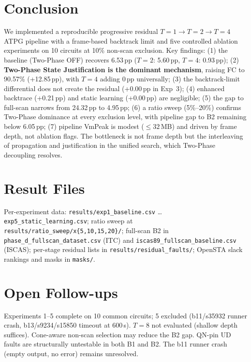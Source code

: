 \documentclass[conference]{IEEEtran}
\begin{document}
\section{Conclusion}
\label{sec:conclusion}
We implemented a reproducible progressive residual
$T{=}1{\to}T{=}2{\to}T{=}4$ ATPG pipeline with a frame-based backtrack limit and
five controlled ablation experiments on 10 circuits at 10\% non-scan exclusion.
Key findings: (1) the baseline (Two-Phase OFF) recovers 6.53\,pp ($T{=}2$:
5.60\,pp, $T{=}4$: 0.93\,pp); (2) \textbf{Two-Phase State Justification is the
dominant mechanism}, raising FC to 90.57\% (+12.85\,pp), with $T{=}4$ adding
0\,pp universally; (3) the backtrack-limit differential does not create the residual
(+0.00\,pp in Exp~3); (4) enhanced backtrace (+0.21\,pp) and static learning
(+0.00\,pp) are negligible; (5) the gap to full-scan narrows from 24.32\,pp to
4.95\,pp; (6) a ratio sweep (5\%--20\%) confirms Two-Phase dominance at every
exclusion level, with pipeline gap to B2 remaining below 6.05\,pp; (7) pipeline
VmPeak is modest (${\leq}32$\,MB) and driven by frame depth, not ablation flags.
The bottleneck is not frame depth but the interleaving of propagation and
justification in the unified search, which Two-Phase decoupling resolves.

\appendices
\section{Result Files}
Per-experiment data: \texttt{results/exp1\_baseline.csv} \ldots
\texttt{exp5\_static\_learning.csv}; ratio sweep at
\texttt{results/ratio\_sweep/x\{5,10,15,20\}/}; full-scan B2 in
\texttt{phase\_d\_fullscan\_dataset.csv} (ITC) and
\texttt{iscas89\_fullscan\_baseline.csv} (ISCAS); per-stage residual lists in
\texttt{results/residual\_faults/}; OpenSTA slack rankings and masks in
\texttt{masks/}.

\section{Open Follow-ups}
Experiments 1--5 complete on 10 common circuits; 5 excluded (b11/s35932 runner
crash, b13/s9234/s15850 timeout at 600\,s). $T{=}8$ not evaluated (shallow depth
suffices). Cone-aware non-scan selection may reduce the B2 gap. QN-pin UD faults
are structurally untestable in both B1 and B2. The b11 runner crash (empty
output, no error) remains unresolved.
\end{document}
